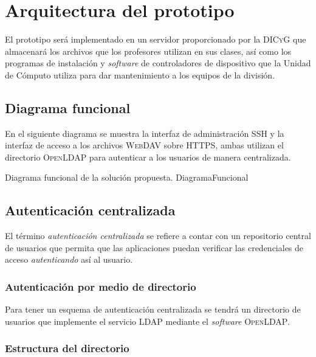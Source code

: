     \section {Arquitectura del prototipo}

El prototipo ser\'{a} implementado en un servidor proporcionado por la \textsc{DICyG} que almacenar\'{a} los archivos que los profesores utilizan en sus clases, as\'{i} como los programas de instalaci\'{o}n y \textit{software} de controladores de dispositivo que la Unidad de C\'{o}mputo utiliza para dar mantenimiento a los equipos de la divisi\'{o}n.

      \subsection {Diagrama funcional}

En el siguiente diagrama se muestra la interfaz de administraci\'{o}n \textsc{SSH} y la interfaz de acceso a los archivos \textsc{WebDAV} sobre \textsc{HTTPS}, ambas utilizan el directorio \textsc{OpenLDAP} para autenticar a los usuarios de manera centralizada.

\diagramblock
{Diagrama funcional de la soluci\'{o}n propuesta.}
{DiagramaFuncional}
{
 {
  
 }
}
\newpage

      \subsection {Autenticaci\'{o}n centralizada}

El t\'{e}rmino \textit{autenticaci\'{o}n centralizada} se refiere a contar con un repositorio central de usuarios que permita que las aplicaciones puedan verificar las credenciales de acceso \textit{autenticando} as\'{i} al usuario.

        \subsubsection {Autenticaci\'{o}n por medio de directorio}

Para tener un esquema de autenticaci\'{o}n centralizada se tendr\'{a} un directorio de usuarios que implemente el servicio LDAP mediante el \textit{software} \textsc{OpenLDAP}.

        \subsubsection {Estructura del directorio}

